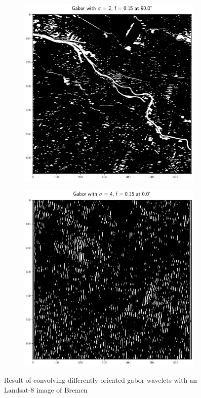 \documentclass[12pt,a4paper, english,twoside]{article}
\begin{document}
\begin{figure}[!htbp]
     \begin{subfigure}[b]{0.45\textwidth}
         \centering
         \includegraphics[width=\textwidth]{img/Features_2_015_90.png}
         \label{fig:feat05}
     \end{subfigure}
     \hfill
     \begin{subfigure}[b]{0.45\textwidth}
         \centering
         \includegraphics[width=\textwidth]{img/Features_4_015_0.png}
         \label{fig:feat06}
     \end{subfigure}
        \caption{Result of convolving differently oriented gabor wavelets with an Landsat-8 image of Bremen}\label{fig:gaborExample}
    \end{figure}
\end{document}

